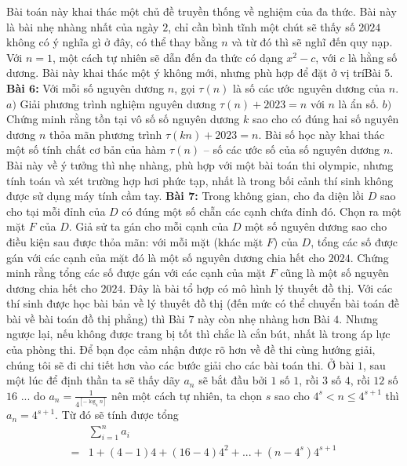 \begin{multicols}{2}
	Bài toán này khai thác một chủ đề truyền thống về nghiệm của đa thức. Bài này là bài nhẹ nhàng nhất của ngày $2$, chỉ cần bình tĩnh một chút sẽ thấy số $2024$ không có ý nghĩa gì ở đây, có thể thay bằng $n$ và từ đó thì sẽ nghĩ đến quy nạp. Với $n = 1$, một cách tự nhiên sẽ dẫn đến đa thức có dạng $x^2 - c$, với $c$ là hằng số dương. Bài này khai thác một ý không mới, nhưng phù hợp để đặt ở vị trí\linebreak Bài $5$.
	\vskip 0.1cm  
	\textbf{\color{cackithi}Bài $\pmb6$:} Với mỗi số nguyên dương $n$, gọi $\tau(n)$ là số các ước nguyên dương của $n$.
	\vskip 0.1cm
	$a)$ Giải phương trình nghiệm nguyên dương $\tau(n) + 2023 = n$ với $n$ là ẩn số.
	\vskip 0.1cm
	$b)$ Chứng minh rằng tồn tại vô số số nguyên dương $k$ sao cho có đúng hai số nguyên dương $n$ thỏa mãn phương trình $\tau(kn) + 2023 = n$. 
	\vskip 0.1cm
	Bài số học này khai thác một số tính chất cơ bản của hàm $\tau(n)$ -- số các ước số của số nguyên dương $n$. Bài này về ý tưởng thì nhẹ nhàng, phù hợp với một bài toán thi olympic, nhưng tính toán và xét trường hợp hơi phức tạp, nhất là trong bối cảnh thí sinh không được sử dụng máy tính cầm tay.
	\vskip 0.1cm 
	\textbf{\color{cackithi}Bài $\pmb7$:} Trong không gian, cho đa diện lồi $D$ sao cho tại mỗi đỉnh của $D$ có đúng một số chẵn các cạnh chứa đỉnh đó. Chọn ra một mặt $F$ của $D$. Giả sử ta gán cho mỗi cạnh của $D$ một số nguyên dương sao cho điều kiện sau được thỏa mãn: với mỗi mặt (khác mặt $F$) của $D$, tổng các số được gán với các cạnh của mặt đó là một số nguyên dương chia hết cho $2024$. Chứng minh rằng tổng các số được gán với các cạnh của mặt $F$ cũng là một số nguyên dương chia hết cho $2024$.
	\vskip 0.1cm
	Đây là bài tổ hợp có mô hình lý thuyết đồ thị. Với các thí sinh được học bài bản về lý thuyết đồ thị (đến mức có thể chuyển bài toán đề bài về bài toán đồ thị phẳng) thì Bài $7$ này còn nhẹ nhàng hơn Bài $4$. Nhưng ngược lại, nếu không được trang bị tốt thì chắc là cắn bút, nhất là trong áp lực của phòng thi. 
	\vskip 0.1cm
	Để bạn đọc cảm nhận được rõ hơn về đề thi cùng hướng giải, chúng tôi sẽ đi chi tiết hơn vào các bước giải cho các bài toán thi.
	\vskip 0.1cm
	Ở bài $1$, sau một lúc để định thần ta sẽ thấy dãy $a_n$ sẽ bắt đầu bởi $1$ số $1$, rồi $3$ số $4$, rồi $12$ số $16$ ... do ${a_n} = \frac{1}{{{4^{[ - {{\log }_4}n]}}}}$ nên một cách tự nhiên, ta chọn $s$ sao cho $4^s < n \le 4^{s+1}$  thì $a_n = 4^{s+1}$. Từ đó sẽ tính được tổng 
	\begin{align*}
			&\sum\limits_{i = 1}^n {a_i}\\
				 = &1 \!+\! (4 \!-\! 1)4 \!+\! (16 \!-\! 4){4^2} \!+\! ... \!+\! (n \!-\! {4^s}){4^{s \!+\! 1}} \\

\end{align*}
\end{multicols}
